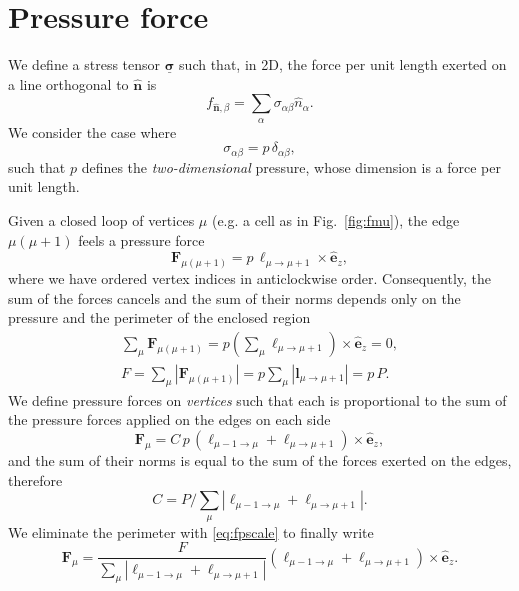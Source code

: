 \documentclass[aps, superscriptaddress, notitlepage, longbibliography]{revtex4-1}
\begin{document}
\section{Pressure force}

We define a stress tensor $\underline{\boldsymbol{\sigma}}$ such that, in 2D, the force per unit length exerted on a line orthogonal to $\hat{\boldsymbol{n}}$ is
\begin{equation}
f_{\hat{\boldsymbol{n}},\beta} = \sum_{\alpha} \sigma_{\alpha\beta} \hat{n}_{\alpha}.
\end{equation}
We consider the case where
\begin{equation}
\sigma_{\alpha\beta} = p \, \delta_{\alpha\beta},
\end{equation}
such that $p$ defines the \textit{two-dimensional} pressure, whose dimension is a force per unit length.

Given a closed loop of vertices $\mu$ (e.g. a cell as in Fig.~\ref{fig:fmu}), the edge $\mu(\mu + 1)$ feels a pressure force
\begin{equation}
\boldsymbol{F}_{\mu(\mu + 1)} = p \, \boldsymbol{\ell}_{\mu \to \mu + 1} \times \hat{\boldsymbol{e}}_z,
\end{equation}
where we have ordered vertex indices in anticlockwise order. Consequently, the sum of the forces cancels and the sum of their norms depends only on the pressure and the perimeter of the enclosed region
\begin{subequations}
\begin{align}
\sum_{\mu} \boldsymbol{F}_{\mu(\mu + 1)} = p \left(\sum_{\mu} \boldsymbol{\ell}_{\mu \to \mu + 1}\right) \times \hat{\boldsymbol{e}}_z = 0,\\
\label{eq:fpscale}
F = \sum_{\mu} |\boldsymbol{F}_{\mu(\mu + 1)}| = p \sum_{\mu} |\boldsymbol{l}_{\mu \to \mu + 1}| = p \, P.
\end{align}
\end{subequations}
We define pressure forces on \textit{vertices} such that each is proportional to the sum of the pressure forces applied on the edges on each side
\begin{equation}
\boldsymbol{F}_{\mu} = C \, p \, \left(\boldsymbol{\ell}_{\mu - 1 \to \mu} + \boldsymbol{\ell}_{\mu \to \mu + 1}\right) \times \hat{\boldsymbol{e}}_z,
\end{equation}
and the sum of their norms is equal to the sum of the forces exerted on the edges, therefore
\begin{equation}
C = P/\sum_{\mu} \left|\boldsymbol{\ell}_{\mu - 1 \to \mu} + \boldsymbol{\ell}_{\mu \to \mu + 1}\right|.
\end{equation}
We eliminate the perimeter with \eqref{eq:fpscale} to finally write
\begin{equation}
\boldsymbol{F}_{\mu} = \frac{F}{\sum_{\mu} \left|\boldsymbol{\ell}_{\mu - 1 \to \mu} + \boldsymbol{\ell}_{\mu \to \mu + 1}\right|} \left(\boldsymbol{\ell}_{\mu - 1 \to \mu} + \boldsymbol{\ell}_{\mu \to \mu + 1}\right) \times \hat{\boldsymbol{e}}_z.
\end{equation}
\end{document}

